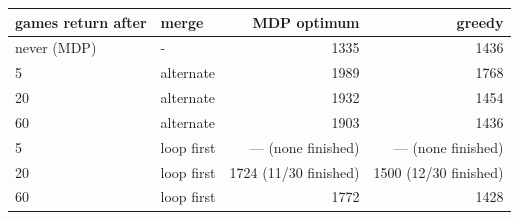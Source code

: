 \begin{tabular}{llrr}
\toprule
games return after & merge & MDP optimum & greedy \\
\midrule
never (MDP) & - & 1335 & 1436 \\
5 & alternate & 1989 & 1768 \\
20 & alternate & 1932 & 1454 \\
60 & alternate & 1903 & 1436 \\
5 & loop first & --- (none finished) & --- (none finished) \\
20 & loop first & 1724 (11/30 finished) & 1500 (12/30 finished) \\
60 & loop first & 1772 & 1428 \\
\bottomrule
\end{tabular}
